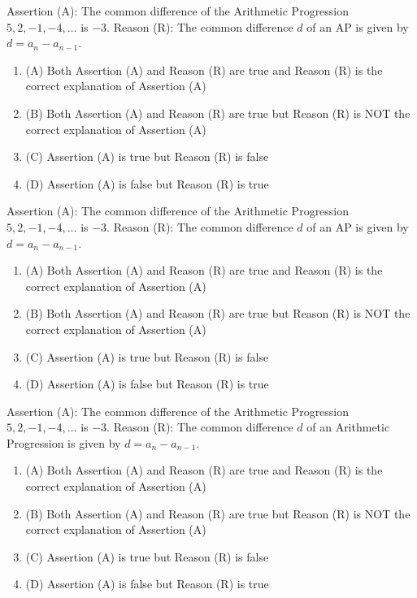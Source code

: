 \documentclass[12pt,a4paper]{exam}
\begin{document}
\begin{questions}
\question[1] Assertion (A): The common difference of the Arithmetic Progression $5, 2, -1, -4, \dots$ is $-3$. Reason (R): The common difference $d$ of an AP is given by $d = a_{n} - a_{n-1}$.
\begin{enumerate}[label=(\Alph*)]
  \item (A) Both Assertion (A) and Reason (R) are true and Reason (R) is the correct explanation of Assertion (A)
  \item (B) Both Assertion (A) and Reason (R) are true but Reason (R) is NOT the correct explanation of Assertion (A)
  \item (C) Assertion (A) is true but Reason (R) is false
  \item (D) Assertion (A) is false but Reason (R) is true
\end{enumerate}
\vspace{0.15cm}

\question[1] Assertion (A): The common difference of the Arithmetic Progression $5, 2, -1, -4, \dots$ is $-3$.
Reason (R): The common difference $d$ of an AP is given by $d = a_{n} - a_{n-1}$.
\begin{enumerate}[label=(\Alph*)]
  \item (A) Both Assertion (A) and Reason (R) are true and Reason (R) is the correct explanation of Assertion (A)
  \item (B) Both Assertion (A) and Reason (R) are true but Reason (R) is NOT the correct explanation of Assertion (A)
  \item (C) Assertion (A) is true but Reason (R) is false
  \item (D) Assertion (A) is false but Reason (R) is true
\end{enumerate}
\vspace{0.15cm}

\question[1] Assertion (A): The common difference of the Arithmetic Progression $5, 2, -1, -4, \dots$ is $-3$. Reason (R): The common difference $d$ of an Arithmetic Progression is given by $d = a_{n} - a_{n-1}$.
\begin{enumerate}[label=(\Alph*)]
  \item (A) Both Assertion (A) and Reason (R) are true and Reason (R) is the correct explanation of Assertion (A)
  \item (B) Both Assertion (A) and Reason (R) are true but Reason (R) is NOT the correct explanation of Assertion (A)
  \item (C) Assertion (A) is true but Reason (R) is false
  \item (D) Assertion (A) is false but Reason (R) is true
\end{enumerate}
\vspace{0.15cm}


\end{questions}
\end{document}
